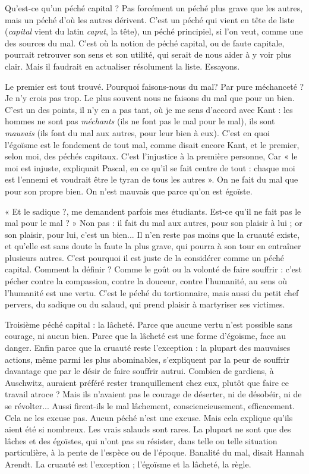 Qu'est-ce qu’un péché capital ? Pas forcément un péché plus grave que les
autres, mais un péché d’où les autres dérivent. C’est un péché qui vient en tête
de liste ({\it capital} vient du latin {\it caput}, la tête), un péché principiel, si l’on veut,
comme une des sources du mal. C’est où la notion de péché capital, ou de faute
capitale, pourrait retrouver son sens et son utilité, qui serait de nous aider à y
voir plus clair. Mais il faudrait en actualiser résolument la liste. Essayons.

Le premier est tout trouvé. Pourquoi faisons-nous du mal? Par pure
méchanceté ? Je n’y crois pas trop. Le plus souvent nous ne faisons du mal que
pour un bien. C’est un des points, il n’y en a pas tant, où je me sens d’accord
avec Kant : les hommes ne sont pas {\it méchants} (ils ne font pas le mal pour le
mal), ils sont {\it mauvais} (ils font du mal aux autres, pour leur bien à eux). C’est
en quoi l’égoïsme est le fondement de tout mal, comme disait encore Kant, et
le premier, selon moi, des péchés capitaux. C’est l’injustice à la première personne,
Car « le moi est injuste, expliquait Pascal, en ce qu’il se fait centre de
tout : chaque moi est l’ennemi et voudrait être le tyran de tous les autres ». On
ne fait du mal que pour son propre bien. On n’est mauvais que parce qu’on est
égoïste.

« Et le sadique ?, me demandent parfois mes étudiants. Est-ce qu’il ne fait
pas le mal pour le mal ? » Non pas : il fait du mal aux autres, pour son plaisir à
lui ; or son plaisir, pour lui, c’est un bien... Il n’en reste pas moins que la
cruauté existe, et qu’elle est sans doute la faute la plus grave, qui pourra à son
tour en entraîner plusieurs autres. C’est pourquoi il est juste de la considérer
comme un péché capital. Comment la définir ? Comme le goût ou la volonté
de faire souffrir : c’est pécher contre la compassion, contre la douceur, contre
l'humanité, au sens où l'humanité est une vertu. C’est le péché du tortionnaire,
mais aussi du petit chef pervers, du sadique ou du salaud, qui prend plaisir à
martyriser ses victimes.

Troisième péché capital : la lâcheté. Parce que aucune vertu n’est possible
sans courage, ni aucun bien. Parce que la lâcheté est une forme d’égoïsme, face
au danger. Enfin parce que la cruauté reste l'exception : la plupart des mauvaises
actions, même parmi les plus abominables, s’expliquent par la peur de
souffrir davantage que par le désir de faire souffrir autrui. Combien de gardiens,
à Auschwitz, auraient préféré rester tranquillement chez eux, plutôt que
faire ce travail atroce ? Mais ils n’avaient pas le courage de déserter, ni de désobéir,
ni de se révolter... Aussi firent-ils le mal lâchement, consciencieusement,
efficacement. Cela ne les excuse pas. Aucun péché n’est une excuse. Mais cela
explique qu'ils aient été si nombreux. Les vrais salauds sont rares. La plupart ne
sont que des lâches et des égoïstes, qui n’ont pas su résister, dans telle ou telle
situation particulière, à la pente de l’espèce ou de l’époque. Banalité du mal,
disait Hannah Arendt. La cruauté est l'exception ; l’égoïsme et la lâcheté, la
règle.

